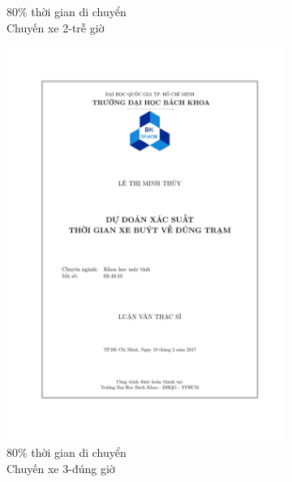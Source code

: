\documentclass[a4paper, 13pt]{report}
\begin{document}
\begin{figure}
\begin{subfigure}[b]{0.25\textwidth}
                \caption*{80\% thời gian di chuyển\\Chuyến xe 2-trễ giờ}
        \end{subfigure}%
        \begin{subfigure}[b]{0.25\textwidth}
                \includegraphics[width=\linewidth]{test3}
                \caption*{80\% thời gian di chuyển\\Chuyến xe 3-đúng giờ}
        \end{subfigure}%
        \begin{subfigure}[b]{0.25\textwidth}

\end{subfigure}
\end{figure}
\end{document}

